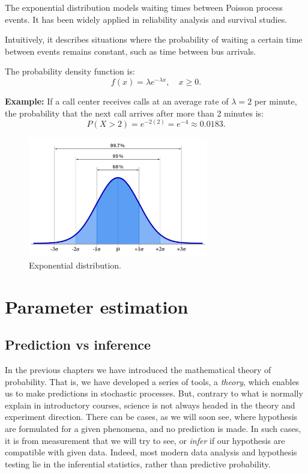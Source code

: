 \documentclass{book}
\begin{document}
The exponential distribution models waiting times between Poisson process events. It has been widely applied in reliability analysis and survival studies.

Intuitively, it describes situations where the probability of waiting a certain time between events remains constant, such as time between bus arrivals.

The probability density function is:
\begin{equation}
    f(x) = \lambda e^{-\lambda x}, \quad x \geq 0.
\end{equation}

\textbf{Example:} If a call center receives calls at an average rate of $\lambda = 2$ per minute, the probability that the next call arrives after more than 2 minutes is:
\begin{equation}
    P(X > 2) = e^{-2(2)} = e^{-4} \approx 0.0183.
\end{equation}

\begin{figure}[ht]
    \centering
    \includegraphics[width=0.7\textwidth]{figures/gaussian.png}
    \caption{Exponential distribution.}
    \label{fig:random}
\end{figure}

\chapter{Parameter estimation}

\section{Prediction vs inference}
In the previous chapters we have introduced the mathematical theory of probability. That is, we have developed a series of tools, a \textit{theory}, which enables us to make predictions in stochastic processes. But, contrary to what is normally explain in introductory courses, science is not always headed in the theory and experiment direction. There can be cases, as we will soon see, where hypothesis are formulated for a given phenomena, and no prediction is made. In such cases, it is from measurement that we will try to see, or \textit{infer} if our hypothesis are compatible with given data. Indeed, most modern data analysis and hypothesis testing lie in the inferential statistics, rather than predictive probability.
\end{document}
